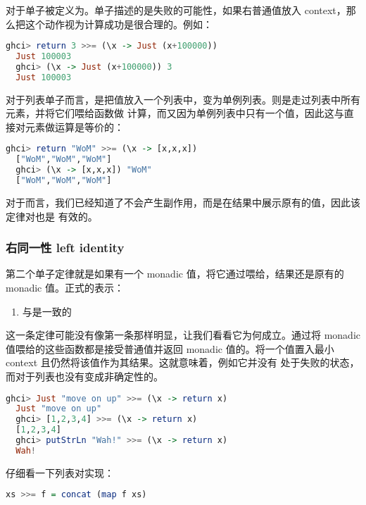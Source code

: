 \documentclass[./main.tex]{subfiles}
\begin{document}
对于单子被定义为。单子描述的是失败的可能性，如果右普通值放入
context，那么把这个动作视为计算成功是很合理的。例如：

\begin{lstlisting}[language=Haskell]
  ghci> return 3 >>= (\x -> Just (x+100000))
  Just 100003
  ghci> (\x -> Just (x+100000)) 3
  Just 100003
\end{lstlisting}

对于列表单子而言，是把值放入一个列表中，变为单例列表。\acode{>>=}则是走过列表中所有元素，并将它们喂给函数做
计算，而又因为单例列表中只有一个值，因此这与直接对元素做运算是等价的：

\begin{lstlisting}[language=Haskell]
  ghci> return "WoM" >>= (\x -> [x,x,x])
  ["WoM","WoM","WoM"]
  ghci> (\x -> [x,x,x]) "WoM"
  ["WoM","WoM","WoM"]
\end{lstlisting}

对于而言，我们已经知道了不会产生副作用，而是在结果中展示原有的值，因此该定律对也是
有效的。

\subsubsection*{右同一性 left identity}

第二个单子定律就是如果有一个 monadic 值，将它通过\acode{>>=}喂给，结果还是原有的 monadic 值。正式的表示：

\begin{enumerate}
  \item {}与是一致的
\end{enumerate}

这一条定律可能没有像第一条那样明显，让我们看看它为何成立。通过\acode{>>=}将 monadic 值喂给的这些函数都是接受普通值并返回
monadic 值的。将一个值置入最小 context 且仍然将该值作为其结果。这就意味着，例如它并没有
处于失败的状态，而对于列表也没有变成非确定性的。

\begin{lstlisting}[language=Haskell]
  ghci> Just "move on up" >>= (\x -> return x)
  Just "move on up"
  ghci> [1,2,3,4] >>= (\x -> return x)
  [1,2,3,4]
  ghci> putStrLn "Wah!" >>= (\x -> return x)
  Wah!
\end{lstlisting}

仔细看一下列表对\acode{>>=}实现：

\begin{lstlisting}[language=Haskell]
  xs >>= f = concat (map f xs)
\end{lstlisting}
\end{document}
